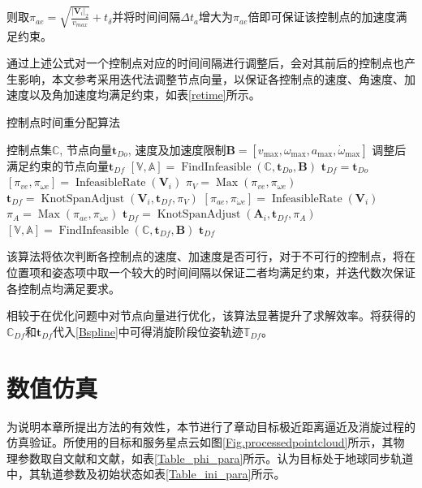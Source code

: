 \documentclass[lang=chs, degree=master, blindreview=false, winfonts=true]{yanputhesis}
\begin{document}
则取$\pi_{ae}=\sqrt{\frac{\vert \boldsymbol{V}_{i}\vert_2}{v_{max}}}+t_{\delta}$并将时间间隔$\Delta t_{a}$增大为$\pi_{ae}$倍即可保证该控制点的加速度满足约束。

通过上述公式对一个控制点对应的时间间隔进行调整后，会对其前后的控制点也产生影响，本文参考\cite{zhouRobustEfficientQuadrotor2019}采用迭代法调整节点向量，以保证各控制点的速度、角速度、加速度以及角加速度均满足约束，如表\ref{retime}所示。

\begin{algorithm}[htb]  
	\caption{控制点时间重分配算法}
	\label{retime}  
	\begin{algorithmic}[1]  
		\Require  
		控制点集$\mathbb{C}$,
		节点向量$\boldsymbol{t}_{Do}$,
		速度及加速度限制$\boldsymbol{B}=[v_{\max},\omega_{\max},a_{\max},\dot{\omega}_{\max}]$
		\Ensure  
		调整后满足约束的节点向量$\boldsymbol{t}_{Df}$
		\State $[\mathbb{V},\mathbb{A}]=\operatorname{FindInfeasible}(\mathbb{C},\boldsymbol{t}_{Do},\boldsymbol{B})$
		\State $\boldsymbol{t}_{Df}=\boldsymbol{t}_{Do}$
		\State $[\pi_{ve},\pi_{\omega e}]=\operatorname{InfeasibleRate}(\boldsymbol{V}_{i})$
		\State $\pi_{V}=\operatorname{Max}(\pi_{ve},\pi_{\omega e})$
		\State $\boldsymbol{t}_{Df}=\operatorname{KnotSpanAdjust}(\boldsymbol{V}_{i},\boldsymbol{t}_{Df},\pi_{V})$
		\EndFor
		\State $[\pi_{ae},\pi_{\dot{\omega} e}]=\operatorname{InfeasibleRate}(\boldsymbol{V}_{i})$
		\State $\pi_{A}=\operatorname{Max}(\pi_{ae},\pi_{\dot{\omega} e})$
		\State $\boldsymbol{t}_{Df}=\operatorname{KnotSpanAdjust}(\boldsymbol{A}_{i},\boldsymbol{t}_{Df},\pi_{A})$
		\EndFor
		\State $[\mathbb{V},\mathbb{A}]=\operatorname{FindInfeasible}(\mathbb{C},\boldsymbol{t}_{Df},\boldsymbol{B})$
		\EndWhile
		\State \Return $\boldsymbol{t}_{Df}$
	\end{algorithmic}
\end{algorithm}

该算法将依次判断各控制点的速度、加速度是否可行，对于不可行的控制点，将在位置项和姿态项中取一个较大的时间间隔以保证二者均满足约束，并迭代数次保证各控制点均满足要求。

相较于在优化问题中对节点向量进行优化，该算法显著提升了求解效率。将获得的$\mathbb{C}_{Df}$和$\boldsymbol{t}_{Df}$代入\autoref{Bspline}中可得消旋阶段位姿轨迹$\mathbb{T}_{Df}$。

\section{数值仿真}
为说明本章所提出方法的有效性，本节进行了章动目标极近距离逼近及消旋过程的仿真验证。所使用的目标和服务星点云如图\ref{Fig.processedpointcloud}所示，其物理参数取自文献和文献，如表\ref{Table_phi_para}所示。认为目标处于地球同步轨道中，其轨道参数及初始状态如表\ref{Table_ini_para}所示。
\end{document}
